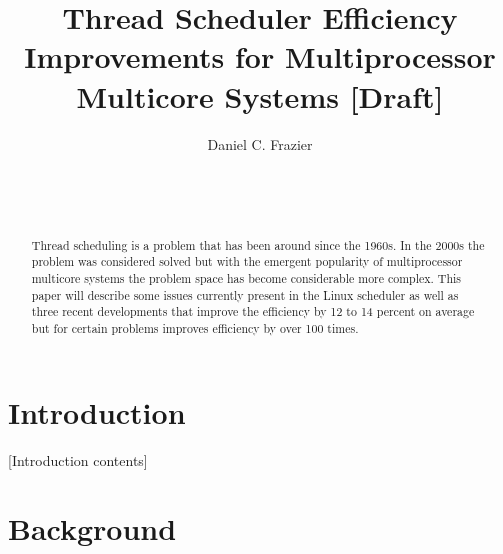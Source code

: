 \documentclass{sig-alternate}
\begin{document}

\title{Thread Scheduler Efficiency Improvements for Multiprocessor Multicore Systems [Draft]}


\author{
\alignauthor
Daniel C. Frazier\\
	\\
	\\
	\\
}
\maketitle


\begin{abstract}
Thread scheduling is a problem that has been around since the 1960s. In the 2000s the problem was considered solved but with the emergent popularity of multiprocessor multicore systems the problem space has become considerable more complex. This paper will describe some issues currently present in the Linux scheduler as well as three recent developments that improve the efficiency by 12 to 14 percent on average but for certain problems improves efficiency by over 100 times.
\end{abstract}



\section{Introduction}
\label{sec:intro}

[Introduction contents]

\section{Background}
\label{sec:bg}
\end{document}
